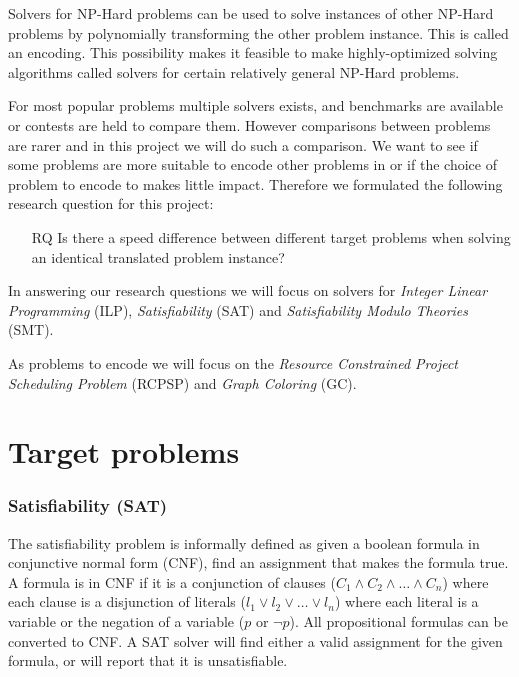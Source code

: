 \documentclass{sig-alternate}
\begin{document}
Solvers for NP-Hard problems can be used to solve instances of other NP-Hard problems by polynomially transforming the other problem instance. This is called an encoding.
This possibility makes it feasible to make highly-optimized solving algorithms called solvers for certain relatively general NP-Hard problems.

For most popular problems multiple solvers exists, and benchmarks are available or contests are held to compare them.
However comparisons between problems are rarer and in this project we will do such a comparison.
We want to see if some problems are more suitable to encode other problems in or if the choice of problem to encode to makes little impact.
Therefore we formulated the following research question for this project:

\begin{enumerate}
\item[RQ]{Is there a speed difference between different target problems when solving an identical translated problem instance?}
\end{enumerate}

In answering our research questions we will focus on solvers for \emph{Integer Linear Programming} (ILP), \emph{Satisfiability} (SAT) and \emph{Satisfiability Modulo Theories} (SMT).

As problems to encode we will focus on the \emph{Resource Constrained Project Scheduling Problem} (RCPSP) and \emph{Graph Coloring} (GC).

\newpage 
\section {Target problems}

\subsubsection*{Satisfiability (SAT)}

The satisfiability problem is informally defined as given a boolean formula in conjunctive normal form (CNF), find an assignment that makes the formula true.
A formula is in CNF if it is a conjunction of clauses ($C_1 \wedge C_2 \wedge \ldots \wedge C_n$) where each clause is a disjunction of literals ($l_1 \lor l_2 \lor \ldots \lor l_n$) where each literal is a variable or the negation of a variable ($p$ or $\neg p$).
All propositional formulas can be converted to CNF.
A SAT solver will find either a valid assignment for the given formula, or will report that it is unsatisfiable.
\end{document}

